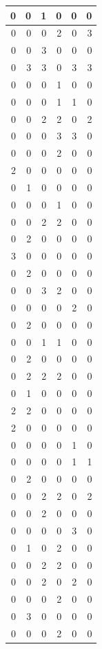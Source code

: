 \documentclass[
  12pt,
]{krantz}
\begin{document}
\begin{tabular}{r|r|r|r|r|r}
\hline
0 & 0 & 1 & 0 & 0 & 0\\
\hline
0 & 0 & 0 & 2 & 0 & 3\\
\hline
0 & 0 & 3 & 0 & 0 & 0\\
\hline
0 & 3 & 3 & 0 & 3 & 3\\
\hline
0 & 0 & 0 & 1 & 0 & 0\\
\hline
0 & 0 & 0 & 1 & 1 & 0\\
\hline
0 & 0 & 2 & 2 & 0 & 2\\
\hline
0 & 0 & 0 & 3 & 3 & 0\\
\hline
0 & 0 & 0 & 2 & 0 & 0\\
\hline
2 & 0 & 0 & 0 & 0 & 0\\
\hline
0 & 1 & 0 & 0 & 0 & 0\\
\hline
0 & 0 & 0 & 1 & 0 & 0\\
\hline
0 & 0 & 2 & 2 & 0 & 0\\
\hline
0 & 2 & 0 & 0 & 0 & 0\\
\hline
3 & 0 & 0 & 0 & 0 & 0\\
\hline
0 & 2 & 0 & 0 & 0 & 0\\
\hline
0 & 0 & 3 & 2 & 0 & 0\\
\hline
0 & 0 & 0 & 0 & 2 & 0\\
\hline
0 & 2 & 0 & 0 & 0 & 0\\
\hline
0 & 0 & 1 & 1 & 0 & 0\\
\hline
0 & 2 & 0 & 0 & 0 & 0\\
\hline
0 & 2 & 2 & 2 & 0 & 0\\
\hline
0 & 1 & 0 & 0 & 0 & 0\\
\hline
2 & 2 & 0 & 0 & 0 & 0\\
\hline
2 & 0 & 0 & 0 & 0 & 0\\
\hline
0 & 0 & 0 & 0 & 1 & 0\\
\hline
0 & 0 & 0 & 0 & 1 & 1\\
\hline
0 & 2 & 0 & 0 & 0 & 0\\
\hline
0 & 0 & 2 & 2 & 0 & 2\\
\hline
0 & 0 & 2 & 0 & 0 & 0\\
\hline
0 & 0 & 0 & 0 & 3 & 0\\
\hline
0 & 1 & 0 & 2 & 0 & 0\\
\hline
0 & 0 & 2 & 2 & 0 & 0\\
\hline
0 & 0 & 2 & 0 & 2 & 0\\
\hline
0 & 0 & 0 & 2 & 0 & 0\\
\hline
0 & 3 & 0 & 0 & 0 & 0\\
\hline
0 & 0 & 0 & 2 & 0 & 0\\

\end{tabular}
\end{document}
